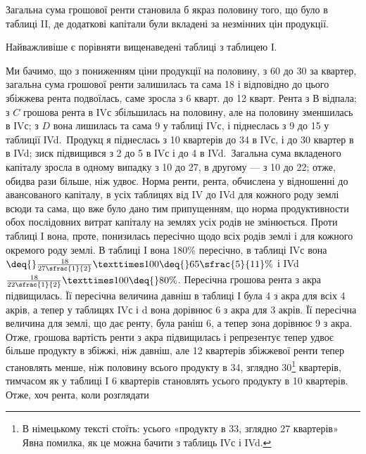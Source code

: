 
Загальна сума грошової ренти становила б якраз половину того, що було
в таблиці II, де додаткові капітали були вкладені за незмінних цін продукції.

Найважливіше є порівняти вищенаведені таблиці з таблицею І.

Ми бачимо, що з пониженням ціни продукції на половину, з 60 до
30 за квартер, загальна сума грошової ренти залишилась та сама \deq{} 18 і відповідно до цього збіжжева рента подвоїлась, саме зросла з 6 кварт. до
12 кварт. Рента з $В$ відпала; з $C$ грошова рента в ІVс збільшилась на половину,
але на половину зменшилась в ІVс; з $D$ вона лишилась та сама \deq{} 9 у таблиці ІVс, і піднеслась з 9 до 15 у таблиції ІVd.~Продукц я піднеслась з 10 квартерів до 34 в ІVс, і до 30 квартер в в IVd;
зиск підвищився з 2 до 5 в ІVс і до 4 в IVd.~Загальна сума
вкладеного капіталу зросла в одному випадку з 10 до 27,
в другому — з 10 до 22; отже, обидва рази більше, ніж удвоє. Норма
ренти, рента, обчислена у відношенні до авансованого капіталу, в усіх таблицях
від IV до IVd для кожного роду землі всюди та сама, що вже було дано тим припущенням,
що норма продуктивности обох послідовних витрат капіталу на землях
усіх родів не змінюється. Проти таблиці І вона, проте, понизилась пересічно
щодо всіх родів землі і для кожного окремого роду землі. В таблиці І вона \deq{}
180\% пересічно, в таблиці ІVс вона$ \deq{} \frac{18}{27\sfrac{1}{2}} × 100 \deq{} 65\sfrac{5}{11}\%$ і
IVd \deq{} $\frac{18}{22\sfrac{1}{2}} × 100 \deq{} 80\%$. Пересічна грошова рента з акра підвищилась. Її пересічна
величина давніш в таблиці І була 4 з акра для всіх 4 акрів,
а тепер у таблицях IVс і d вона дорівнює 6 з акра для 3 акрів.
Її пересічна величина для землі, що дає ренту, була раніш 6, а тепер
зона дорівнює 9 з акра. Отже, грошова вартість ренти з акра підвищилась
і репрезентує тепер удвоє більше продукту в збіжжі, ніж давніш, але
12 квартерів збіжжевої ренти тепер становлять менше, ніж половину всього продукту
в 34, зглядно 30\footnote*{В німецькому тексті стоїть: усього «продукту в 33, зглядно 27 квартерів» Явна помилка,
як це можна бачити з таблиць ІVс і IVd. } квартерів, тимчасом як у таблиці І 6 квартерів становлять
  усього продукту в 10 квартерів. Отже, хоч рента, коли розглядати
